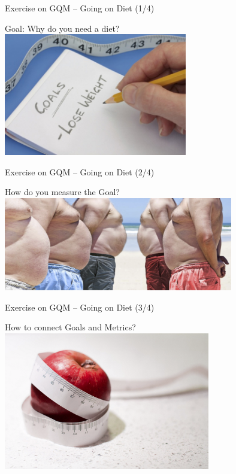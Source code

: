 \documentclass{beamer}
\begin{document}
\begin{frame}{\centerline{Exercise on GQM -- Going on Diet (1/4)}}

\begin{center}

\Large Goal: Why do you need a diet?\\
\vspace{0.5cm}
\includegraphics[width=80mm]{A2022.IDSEPC.SperimentazioneDeduzione/GoalOnDiet.jpg}
\end{center}
\end{frame}

\begin{frame}{\centerline{Exercise on GQM -- Going on Diet (2/4)}}

\begin{center}

\Large How do you measure the Goal?\\
\vspace{0.5cm}
\includegraphics[width=100mm]{A2022.IDSEPC.SperimentazioneDeduzione/MeasuringGoalDiet.png}
\end{center}
\end{frame}

\begin{frame}{\centerline{Exercise on GQM -- Going on Diet (3/4)}}

\begin{center}

\Large How to connect Goals and Metrics?\\
\vspace{0.5cm}
\includegraphics[width=90mm]{A2022.IDSEPC.SperimentazioneDeduzione/ConnectionWithQuestions.png}
\end{center}
\end{frame}
\end{document}
